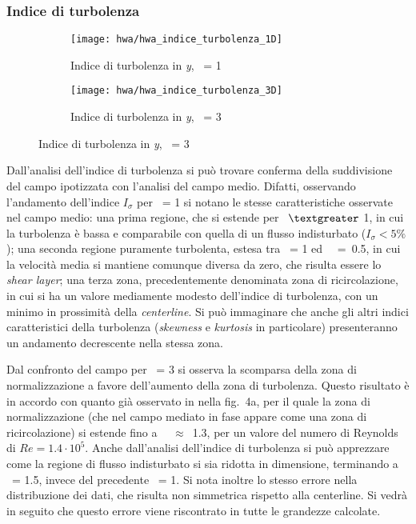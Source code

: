\documentclass{article} %
\newcommand{\xd}{\nicefrac{\textrm{x}}{\textrm{D}}\ }
\newcommand{\yd}{\nicefrac{\textrm{y}}{\textrm{D}}\ }
\begin{document}
\subsubsection{Indice di turbolenza}
\begin{figure}[h!]
	\begin{subfigure}{0.5\textwidth}
		\texttt{[image: hwa/hwa\_indice\_turbolenza\_1D]} %
		\label{hwa_indice_turbolenza_1D} 
		\caption{Indice di turbolenza in \textit{y}, \xd = 1}
	\end{subfigure}
	\begin{subfigure}{0.5\textwidth}
		\texttt{[image: hwa/hwa\_indice\_turbolenza\_3D]} %
		\label{hwa_indice_turbolenza_3D}
		\caption{Indice di turbolenza in \textit{y}, \xd = 3}
	\end{subfigure}	
\end{figure}
\begin{minipage}[t]{0.5\textwidth}
	\centering
	\begin{minipage}[t]{0.95\textwidth} \onehalfspacing
		Dall'analisi dell'indice di turbolenza si può trovare conferma della suddivisione del campo ipotizzata con l'analisi del campo medio. Difatti, osservando l'andamento dell'indice $I_{\sigma}$ per \xd = 1 si notano le stesse caratteristiche osservate nel campo medio: una prima regione, che si estende per \yd $\textgreater$ 1, in cui la turbolenza è bassa e comparabile con quella di un flusso indisturbato ($I_\sigma < 5\%$); una seconda regione puramente turbolenta, estesa tra \yd = 1 ed \yd~=~0.5, in cui la velocità media si mantiene comunque diversa da zero, che risulta essere lo \textit{shear layer}; una terza zona, precedentemente denominata zona di ricircolazione, in cui si ha un valore mediamente modesto dell'indice di turbolenza, con un minimo in prossimità della \textit{centerline}. Si può immaginare che anche gli altri indici caratteristici della turbolenza (\textit{skewness} e \textit{kurtosis} in particolare) presenteranno un andamento decrescente nella stessa zona.
	\end{minipage}
\end{minipage}
\begin{minipage}[t]{0.5\textwidth}
	\centering
	\begin{minipage}[t]{0.95\textwidth} \onehalfspacing
		Dal confronto del campo per \xd = 3 si osserva la scomparsa della zona di normalizzazione a favore dell'aumento della zona di turbolenza. Questo risultato è in accordo con quanto già osservato in \cite{braza06} nella fig.~4a, per il quale la zona di normalizzazione (che nel campo mediato in fase appare come una zona di ricircolazione) si estende fino a \xd~$\approx$~1.3, per un valore del numero di Reynolds di $Re = 1.4\cdot10^5$. Anche dall'analisi dell'indice di turbolenza si può apprezzare come la regione di flusso indisturbato si sia ridotta in dimensione, terminando a \yd = 1.5, invece del precedente \yd = 1. Si nota inoltre lo stesso errore nella distribuzione dei dati, che risulta non simmetrica rispetto alla centerline. Si vedrà in seguito che questo errore viene riscontrato in tutte le grandezze calcolate.
	\end{minipage}
\end{minipage}
\newpage
\end{document}
